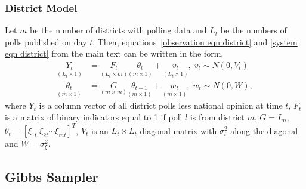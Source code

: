 \documentclass[12pt,final,fleqn]{article}
\theoremstyle{plain}
\begin{document}
\subsubsection{District Model} 
Let $m$ be the number of districts with polling data and $L_t$ be the numbers of polls published on day $t$. Then, equations~\ref*{observation eqn district} and \ref*{system eqn district} from the main text can be written in the form,
\begin{align}
\label{eqn: dlm observation}
\underset{(L_t \times 1)}{Y_t} &= \underset{(L_t \times m)}{F_t} \underset{(m \times 1)}{\theta_t} + \underset{(L_t \times 1)}{v_t},\; v_t \sim N(0, V_t)\\
\label{eqn: dlm state}
\underset{(m \times 1)}{\theta_t} &= \underset{(m \times m)}{G}\underset{(m \times 1)}{\theta_{t-1}} + \underset{(m \times 1)}{w_t},\; w_t \sim N(0, W),
\end{align}
where $Y_t$ is a column vector of all district polls less national opinion at time $t$, $F_t$ is a matrix of binary indicators equal to 1 if poll $l$ is from district $m$, $G= I_m$, $\theta_t = [\xi_{1t}\; \xi_{2t}\cdots \xi_{mt}]^T$, $V_t$ is an $L_t \times L_t$ diagonal matrix with $\sigma^2_l$ along the diagonal and $W = \sigma^2_\xi$.

\subsection{Gibbs Sampler}
\end{document}
